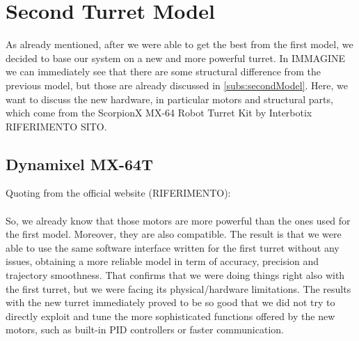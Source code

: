 \section{Second Turret Model}\label{sec:turret64}
As already mentioned, after we were able to get the best from the first model, we decided to base our system on a new and more powerful turret. In IMMAGINE we can immediately see that there are some structural difference from the previous model, but those are already discussed in \ref{subs:secondModel}. Here, we want to discuss the new hardware, in particular motors and structural parts, which come from the ScorpionX MX-64 Robot Turret Kit by Interbotix RIFERIMENTO SITO.
\subsection{Dynamixel MX-64T}
Quoting from the official website (RIFERIMENTO):\\
\\
So, we already know that those motors are more powerful than the ones used for the first model. Moreover, they are also compatible. The result is that we were able to use the same software interface written for the first turret without any issues, obtaining a more reliable model in term of accuracy, precision and trajectory smoothness. That confirms that we were doing things right also with the first turret, but we were facing its physical/hardware limitations. The results with the new turret immediately proved to be so good that we did not try to directly exploit and tune the more sophisticated functions offered by the new motors, such as built-in PID controllers or faster communication.
